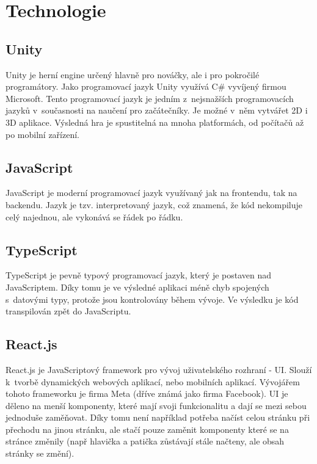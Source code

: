 \section{Technologie}

\subsection{Unity}
Unity je herní engine určený hlavně pro nováčky, ale i pro pokročilé programátory. Jako programovací jazyk Unity využívá C\# vyvíjený firmou Microsoft. Tento programovací jazyk je jedním z~nejsnažších programovacích jazyků v~současnosti na naučení pro začátečníky. \cite{Csharp} Je možné v~něm vytvářet 2D i 3D aplikace. Výsledná hra je spustitelná na mnoha platformách, od počítačů až po mobilní zařízení. \cite{Unity}

\subsection{JavaScript}
JavaScript je moderní programovací jazyk využívaný jak na frontendu, tak na backendu. Jazyk je tzv. interpretovaný jazyk, což znamená, že kód nekompiluje celý najednou, ale vykonává se řádek po řádku. \cite{JavaScript}

\subsection{TypeScript}
TypeScript je pevně typový programovací jazyk, který je postaven nad JavaScriptem. Díky tomu je ve výsledné aplikaci méně chyb spojených s~datovými typy, protože jsou kontrolovány během vývoje. Ve výsledku je kód transpilován zpět do JavaScriptu. \cite{TypeScript}

\subsection{React.js}
React.js je JavaScriptový framework pro vývoj uživatelského rozhraní - UI. Slouží k~tvorbě dynamických webových aplikací, nebo mobilních aplikací. Vývojářem tohoto frameworku je firma Meta (dříve známá jako firma Facebook). UI je děleno na menší komponenty, které mají svoji funkcionalitu a dají se mezi sebou jednoduše zaměňovat. Díky tomu není například potřeba načíst celou stránku při přechodu na jinou stránku, ale stačí pouze zaměnit komponenty které se na stránce změnily (např hlavička a patička zůstávají stále načteny, ale obsah stránky se změní). \cite{React}

